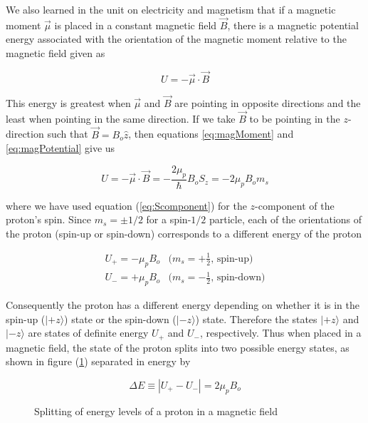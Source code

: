 We also learned in the unit on electricity and magnetism that if a magnetic moment $\vec{\mu}$ is placed in a constant magnetic field $\vec{B}$, there is a magnetic potential energy associated with the orientation of the magnetic moment relative to the magnetic field given as 

\begin{equation}
U = - \vec{\mu} \cdot \vec{B}
\label{eq:magPotential}
\end{equation}

This energy is greatest when $\vec{\mu}$ and $\vec{B}$ are pointing in opposite directions and the least when pointing in the same direction.  If we take  $\vec{B}$ to be pointing in the $z$-direction such that $\vec{B} = B_o \hat{z}$, then equations \ref{eq:magMoment} and \ref{eq:magPotential} give us

\begin{equation}
U = - \vec{\mu} \cdot \vec{B} = - \frac{2 \mu_p}{\hbar} B_o S_z = - 2 \mu_p B_o m_s 
\end{equation}
 
\noindent where we have used equation (\ref{eq:Scomponent}) for the $z$-component of the proton's spin.  Since $m_s = \pm 1 / 2$ for a spin-$1/2$ particle, each of the orientations of the proton (spin-up or spin-down) corresponds to a different energy of the proton

\begin{eqnarray}
  U_+ = -  \mu_p B_o & \mbox{$(m_s = +\frac{1}{2}$, spin-up)} \\
  U_- = +  \mu_p B_o & \mbox{$(m_s = -\frac{1}{2}$, spin-down)} 
\end{eqnarray}

\noindent Consequently the proton has a different energy depending on whether it is in the spin-up ($|\mbox{$+z$}\rangle$) state or the spin-down ($|\mbox{$-z$}\rangle$) state.  Therefore the states $|\mbox{$+z$}\rangle$ and $|\mbox{$-z$}\rangle$ are states of definite energy $U_+$ and $U_-$, respectively. 
Thus when placed in a magnetic field, the state of the proton splits into two possible energy states, as shown in figure (\ref{fig:levelsplitting}) separated in energy by

\begin{equation}
\label{eq:deltaE}
\Delta E \equiv |U_+ - U_-| =  2\mu_p B_o
\end{equation}

\begin{figure}[h]
\begin{center}
\caption{Splitting of energy levels of a proton in a magnetic field}
\label{fig:levelsplitting}
\end{center}
\end{figure}

